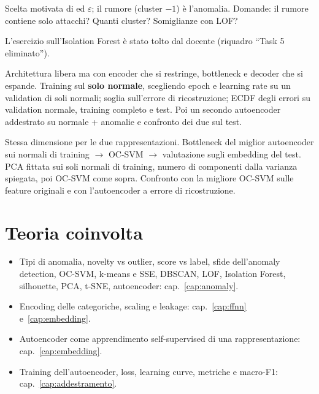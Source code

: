 \begin{description}[style=nextline,leftmargin=1.2em]
\item[Task 4B -- DBSCAN]
  Scelta motivata di  ed $\varepsilon$; il rumore (cluster $-1$) è l'anomalia.
  Domande: il rumore contiene solo attacchi? Quanti cluster? Somiglianze con LOF?
\item[Task 5 -- (eliminato)]
  L'esercizio sull'Isolation Forest è stato tolto dal docente (riquadro ``Task 5 eliminato'').
\item[Task 6 -- Autoencoder]
  Architettura libera ma con encoder che si restringe, bottleneck e decoder che si espande. Training
  sul \textbf{solo normale}, scegliendo epoch e learning rate su un validation di soli normali; soglia
  sull'errore di ricostruzione; ECDF degli errori su validation normale, training completo e test.
  Poi un secondo autoencoder addestrato su normale + anomalie e confronto dei due sul test.
\item[Task 7 -- PCA contro bottleneck dell'autoencoder]
  Stessa dimensione per le due rappresentazioni. Bottleneck del miglior autoencoder sui normali di
  training $\to$ OC-SVM $\to$ valutazione sugli embedding del test. PCA fittata sui soli normali di
  training, numero di componenti dalla varianza spiegata, poi OC-SVM come sopra. Confronto con la
  migliore OC-SVM sulle feature originali e con l'autoencoder a errore di ricostruzione.
\end{description}

\section{Teoria coinvolta}
\begin{itemize}
  \item Tipi di anomalia, novelty vs outlier, score vs label, sfide dell'anomaly detection, OC-SVM,
        k-means e SSE, DBSCAN, LOF, Isolation Forest, silhouette, PCA, t-SNE, autoencoder:
        cap.~\ref{cap:anomaly}.
  \item Encoding delle categoriche, scaling e leakage: cap.~\ref{cap:ffnn} e~\ref{cap:embedding}.
  \item Autoencoder come apprendimento self-supervised di una rappresentazione: cap.~\ref{cap:embedding}.
  \item Training dell'autoencoder, loss, learning curve, metriche e macro-F1: cap.~\ref{cap:addestramento}.
\end{itemize}

